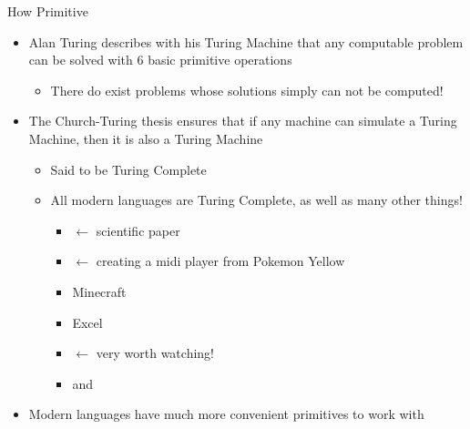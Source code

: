 \documentclass[pdf, aspectratio=169, 12pt]{beamer}
\begin{document}
\begin{frame}{How Primitive}
	\begin{itemize}
		\item<1-> Alan Turing describes with his Turing Machine that \alert{any computable} problem can be solved with 6 basic primitive operations
			\begin{itemize}
				\item There do exist problems whose solutions simply can not be computed!
			\end{itemize}
		\item<2-> The Church-Turing thesis ensures that if any machine can simulate a Turing Machine, then it is also a Turing Machine
			\begin{itemize}
				\item Said to be \alert{Turing Complete}
				\item All modern languages are Turing Complete, as well as many other things!
					\begin{itemize}
						\item {} $\leftarrow$ scientific paper
						\item {} $\leftarrow$ creating a midi player from Pokemon Yellow
						\item Minecraft
						\item Excel
						\item {} $\leftarrow$ very worth watching!
						\item and 
					\end{itemize}
			\end{itemize}
		\item<3-> Modern languages have much more convenient primitives to work with
	\end{itemize}
\end{frame}
\end{document}
